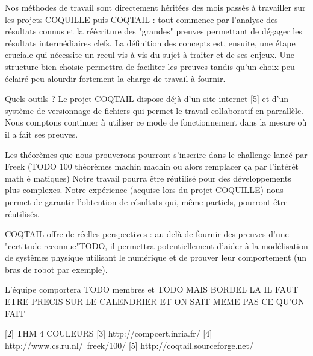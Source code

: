 \documentclass[11pt]{article}
\begin{document}
Nos méthodes de travail sont directement héritées des mois passés à travailler sur les projets COQUILLE puis COQTAIL : tout commence par l'analyse des résultats connus et la réécriture des "grandes" preuves permettant de dégager les résultats intermédiaires clefs. La définition des concepts est, ensuite, une étape cruciale qui nécessite un recul vis-à-vis du sujet à traiter et de ses enjeux. Une structure bien choisie permettra de faciliter les preuves tandis qu'un choix peu éclairé peu alourdir fortement la charge de travail à fournir.

Quels outils ?
Le projet COQTAIL dispose déjà d'un site internet [5] et d'un système de versionnage de fichiers qui permet le travail collaboratif en parrallèle. Nous comptons continuer à utiliser ce mode de fonctionnement dans la mesure où il a fait ses preuves.


Les théorèmes que nous prouverons pourront s'inscrire dans le challenge lancé par Freek (TODO 100 théorèmes machin machin ou alors remplacer ça par l'intérêt math é matiques) Notre travail pourra être réutilisé pour des développements plus complexes. Notre expérience (acquise lors du projet COQUILLE) nous permet de garantir l'obtention de résultats qui, même partiels, pourront être réutilisés.


COQTAIL offre de réelles perspectives : au delà de fournir des preuves d'une "certitude reconnue"TODO, il permettra potentiellement d'aider à la modélisation de systèmes physique utilisant le numérique et de prouver leur comportement  (un bras de robot par exemple).

L'équipe comportera TODO membres et TODO MAIS BORDEL LA IL FAUT ETRE PRECIS SUR LE CALENDRIER ET ON SAIT MEME PAS CE QU'ON FAIT

[2] THM 4 COULEURS
[3] http://compcert.inria.fr/
[4] http://www.cs.ru.nl/~freek/100/
[5] http://coqtail.sourceforge.net/



 
\end{document}
